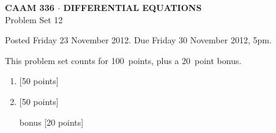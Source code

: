 \documentclass[10pt]{article}
\begin{document}
\begin{center}
\large \textsf{\textbf{CAAM 336 $\cdot$ DIFFERENTIAL EQUATIONS}\\[0.5em]
 Problem Set 12 }
\end{center}

Posted Friday 23 November 2012.  Due Friday 30 November 2012, 5pm.

\begin{center}
This problem set counts for 100~points, plus a 20~point bonus.\\
\end{center}


\begin{enumerate}
\item {[50 points]}\\ 

\item {[50 points]}\\ 
\newpage

\item[bonus] {[20 points]}\\ 
\end{enumerate}
\end{document}

